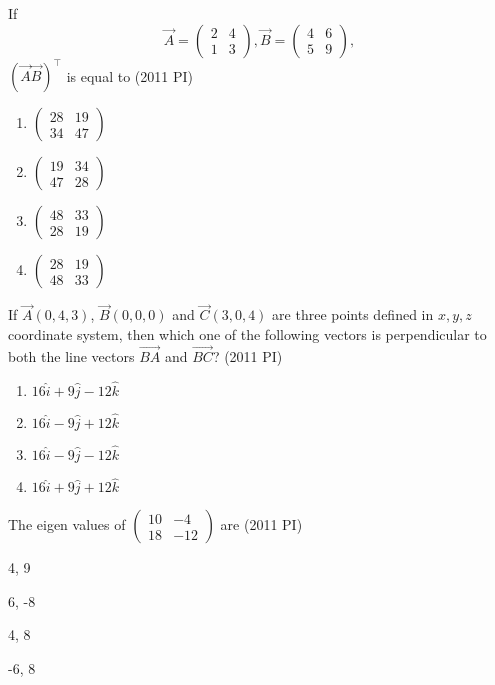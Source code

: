 \item If 
\[
\vec{A} = \begin{pmatrix} 2 & 4 \\ 1 & 3 \end{pmatrix}, 
\vec{B} = \begin{pmatrix} 4 & 6 \\ 5 & 9 \end{pmatrix},
\]
$(\vec{A}\vec{B})^{\top}$ is equal to
\hfill(2011 PI)
\begin{multicols}{4}
\begin{enumerate}
    \item $\begin{pmatrix} 28 & 19 \\ 34 & 47 \end{pmatrix}$
    \item $\begin{pmatrix} 19 & 34 \\ 47 & 28 \end{pmatrix}$
    \item $\begin{pmatrix} 48 & 33 \\ 28 & 19 \end{pmatrix}$
    \item $\begin{pmatrix} 28 & 19 \\ 48 & 33 \end{pmatrix}$
\end{enumerate}
\end{multicols}
\item If $\vec{A}(0,4,3)$, $\vec{B}(0,0,0)$ and $\vec{C}(3,0,4)$ are three points defined in $x,y,z$ coordinate system, then which one of the following vectors is perpendicular to both the line vectors $\overrightarrow{BA}$ and $\overrightarrow{BC}$?
\hfill(2011 PI)
\begin{multicols}{4}
\begin{enumerate}
    \item $16\hat{i} + 9\hat{j} - 12\hat{k}$
    \item $16\hat{i} - 9\hat{j} + 12\hat{k}$
    \item $16\hat{i} - 9\hat{j} - 12\hat{k}$
    \item $16\hat{i} + 9\hat{j} + 12\hat{k}$
\end{enumerate}
\end{multicols}
\item
The eigen values of 
$
\begin{pmatrix}
10 & -4 \\
18 & -12
\end{pmatrix}
$ are
\hfill(2011 PI)
\begin{enumerate}
\begin{multicols}{4}
    \item 4, 9
    \item 6, -8
    \item 4, 8
    \item -6, 8
\end{multicols}
\end{enumerate}
